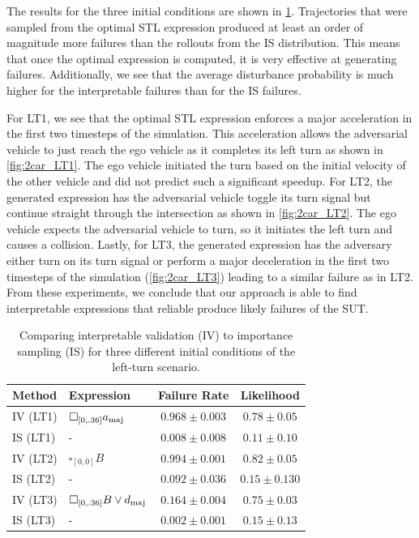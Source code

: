 The results for the three initial conditions are shown in \cref{tab:2car_results}. Trajectories that were sampled from the optimal STL expression produced at least an order of magnitude more failures than the rollouts from the IS distribution. This means that once the optimal expression is computed, it is very effective at generating failures. Additionally, we see that the average disturbance probability is much higher for the interpretable failures than for the IS failures. 

For LT1, we see that the optimal STL expression enforces a major acceleration in the first two timesteps of the simulation. This acceleration allows the adversarial vehicle to just reach the ego vehicle as it completes its left turn as shown in \cref{fig:2car_LT1}. The ego vehicle initiated the turn based on the initial velocity of the other vehicle and did not predict such a significant speedup. For LT2, the generated expression has the adversarial vehicle toggle its turn signal but continue straight through the intersection as shown in \cref{fig:2car_LT2}. The ego vehicle expects the adversarial vehicle to turn, so it initiates the left turn and causes a collision. Lastly, for LT3, the generated expression has the adversary either turn on its turn signal or perform a major deceleration in the first two timesteps of the simulation (\cref{fig:2car_LT3}) leading to a similar failure as in LT2. From these experiments, we conclude that our approach is able to find interpretable expressions that reliable produce likely failures of the SUT.

\begin{table}
    \centering
    \caption{Comparing interpretable validation (IV) to importance sampling (IS) for three different initial conditions of the left-turn scenario.}
    \label{tab:2car_results}
    \begin{tabular}{@{}llcc@{}} 
        \toprule
        \textbf{Method} & \textbf{Expression} & \textbf{Failure Rate} & \textbf{Likelihood} \\
        \midrule
        IV (LT1) & $\square_{[0, .36]} a_{\rm maj}$ & $0.968 \pm 0.003$ & $0.78 \pm 0.05$ \\
        IS (LT1) & - &$0.008 \pm 0.008$ & $0.11 \pm 0.10$ \\
        \midrule
        IV (LT2) & $\square_{[0, 0]} B$ & $0.994 \pm 0.001$ & $0.82 \pm 0.05$ \\
        IS (LT2) & - & $0.092 \pm 0.036$ & $0.15 \pm 0.130$ \\
        \midrule
        IV (LT3) & $\square_{[0, .36]} B \lor d_{\rm maj}$ & $0.164 \pm 0.004$ & $0.75 \pm 0.03$ \\
        IS (LT3) & - & $0.002 \pm 0.001$ & $0.15 \pm 0.13$  \\
        \bottomrule
    \end{tabular}
\end{table}


